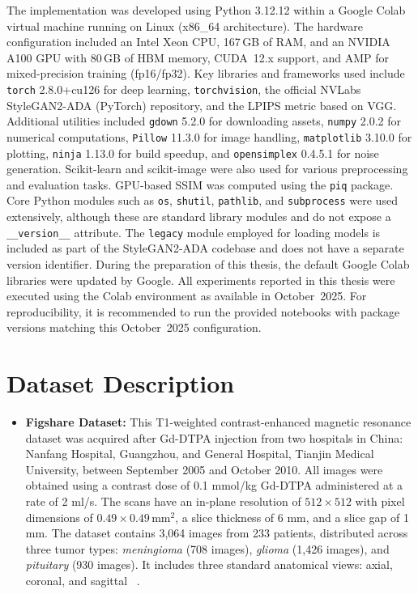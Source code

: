 The implementation was developed using Python 3.12.12 within a Google Colab virtual machine running on Linux (x86\_64 architecture). The hardware configuration included an Intel Xeon CPU, 167\,GB of RAM, and an NVIDIA A100 GPU with 80\,GB of HBM memory, CUDA~12.x support, and AMP for mixed-precision training (fp16/fp32). Key libraries and frameworks used include \texttt{torch} 2.8.0+cu126 for deep learning, \texttt{torchvision}, the official NVLabs StyleGAN2-ADA (PyTorch) repository, and the LPIPS metric based on VGG. Additional utilities included \texttt{gdown} 5.2.0 for downloading assets, \texttt{numpy} 2.0.2 for numerical computations, \texttt{Pillow} 11.3.0 for image handling, \texttt{matplotlib} 3.10.0 for plotting, \texttt{ninja} 1.13.0 for build speedup, and \texttt{opensimplex} 0.4.5.1 for noise generation. Scikit-learn and scikit-image were also used for various preprocessing and evaluation tasks. GPU-based SSIM was computed using the \texttt{piq} package. Core Python modules such as \texttt{os}, \texttt{shutil}, \texttt{pathlib}, and \texttt{subprocess} were used extensively, although these are standard library modules and do not expose a \texttt{\_\_version\_\_} attribute. The \texttt{legacy} module employed for loading models is included as part of the StyleGAN2-ADA codebase and does not have a separate version identifier.
During the preparation of this thesis, the default Google Colab libraries were updated by Google. 
All experiments reported in this thesis were executed using the Colab environment as available in October~2025. For reproducibility, it is recommended to run the provided notebooks with package versions matching this October~2025 configuration.



\section{Dataset Description}

\begin{itemize}
  
    \item \textbf{Figshare Dataset:} This T1-weighted contrast-enhanced magnetic resonance dataset was acquired after Gd-DTPA injection from two hospitals in China: Nanfang Hospital, Guangzhou, and General Hospital, Tianjin Medical University, between September 2005 and October 2010. All images were obtained using a contrast dose of 0.1 mmol/kg Gd-DTPA administered at a rate of 2 ml/s. The scans have an in-plane resolution of $512 \times 512$ with pixel dimensions of $0.49 \times 0.49\,\text{mm}^2$, a slice thickness of 6 mm, and a slice gap of 1 mm. The dataset contains 3,064 images from 233 patients, distributed across three tumor types: \textit{meningioma} (708 images), \textit{glioma} (1,426 images), and \textit{pituitary} (930 images). It includes three standard anatomical views: axial, coronal, and sagittal~\cite{cheng2017figshare} \cite{Cheng2015}.\\
    \end{itemize}

